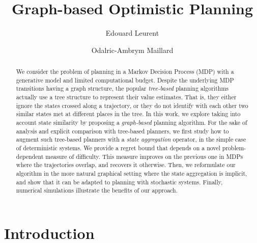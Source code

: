 \documentclass[runningheads]{llncs}
\begin{document}
\title{Graph-based Optimistic Planning}
%
%
\author{Edouard Leurent \and Odalric-Ambrym Maillard}
%
%
%
\maketitle              %
%
\begin{abstract}
	We consider the problem of planning in a Markov Decision Process (MDP) with a generative model and limited computational budget. Despite the underlying MDP transitions having a graph structure, the popular \emph{tree-based} planning algorithms actually use a tree structure to represent their value estimates. That is, they either ignore the states crossed along a trajectory, or they do not identify with each other two similar states met at different places in the tree. In this work, we explore taking into account state similarity by proposing a \emph{graph-based} planning algorithm. For the sake of analysis and explicit comparison with tree-based planners, we first study how to augment such tree-based planners with a \emph{state aggregation} operator, in the simple case of deterministic systems. We provide a regret bound that depends on a novel problem-dependent measure of difficulty. This measure improves on the previous one in MDPs where the trajectories overlap, and recovers it otherwise. Then, we reformulate our algorithm in the more natural graphical setting where the state aggregation is implicit, and show that it can be adapted to planning with stochastic systems. Finally, numerical simulations illustrate the benefits of our approach.
	
\end{abstract}
%
%
%

\section{Introduction}
\end{document}
